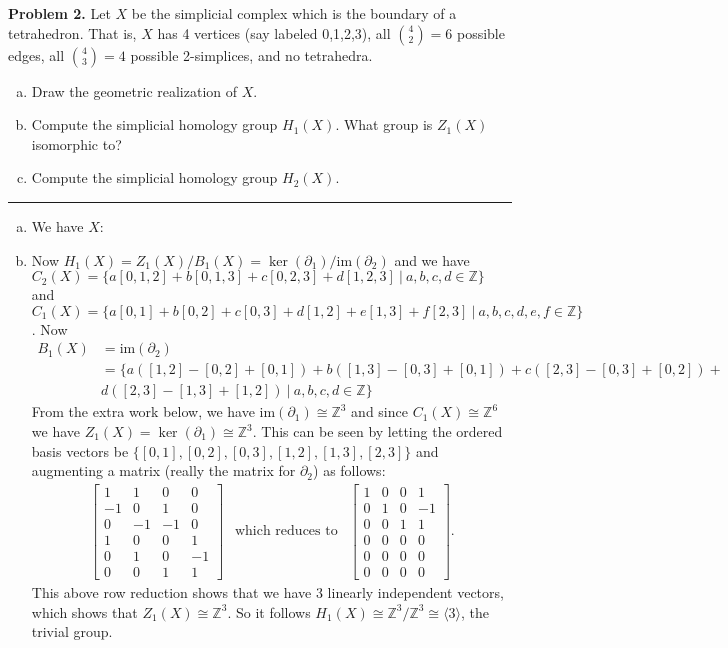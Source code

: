 \documentclass[leqno]{article}
\theoremstyle{nonumberplain}
\newcommand{\Z}{\ensuremath{\mathbb{Z}}}
\newcommand{\im}{\ensuremath{\mathrm{im}}}
\begin{document}
\noindent\textbf{Problem 2.} Let $X$ be the simplicial complex which is the boundary of a tetrahedron. That is, $X$ has 4 vertices (say labeled 0,1,2,3), all ${{4}\choose{2}}=6$ possible edges, all ${{4}\choose{3}} =4$ possible 2-simplices, and no tetrahedra.
\begin{enumerate}[(a)]
\item Draw the geometric realization of $X$.
\item Compute the simplicial homology group $H_1(X)$. What group is $Z_1(X)$ isomorphic to?
\item Compute the simplicial homology group $H_2(X)$. 
\end{enumerate}


\noindent\rule[0.5ex]{\linewidth}{1pt}
\begin{enumerate}[(a)]
\item We have $X$:
\vspace*{5cm}

\item Now $H_1(X)=Z_1(X)/B_1(X)=\ker(\partial_1)/\im(\partial_2)$ and we have $C_2(X)=\{a[0,1,2]+b[0,1,3]+c[0,2,3]+d[1,2,3]~\vert~ a,b,c,d\in \Z\}$ and $C_1(X)=\{a[0,1]+b[0,2]+c[0,3]+d[1,2]+e[1,3]+f[2,3]~\vert~a,b,c,d,e,f\in \Z\}$. Now 
\begin{align*}
B_1(X)&=\im(\partial_2)\\
&=\{a([1,2]-[0,2]+[0,1])+b([1,3]-[0,3]+[0,1])+c([2,3]-[0,3]+[0,2])+\\
&d([2,3]-[1,3]+[1,2])~\vert~ a,b,c,d \in \Z\}
\end{align*}
From the extra work below, we have $\im(\partial_1)\cong \Z^3$ and since $C_1(X)\cong \Z^6$ we have $Z_1(X)=\ker(\partial_1)\cong \Z^3$. This can be seen by letting the ordered basis vectors be $\{[0,1],[0,2],[0,3],[1,2],[1,3],[2,3]\}$ and augmenting a matrix (really the matrix for $\partial_2$) as follows:
\begin{align*}
\begin{bmatrix}
1 & 1 & 0 & 0\\
-1 & 0 & 1 & 0\\
0 & -1 & -1 & 0\\
1 & 0 & 0 & 1\\
0 & 1 & 0 & -1\\
0 & 0 & 1 & 1
\end{bmatrix} ~~\textrm{ which reduces to }~~ 
\begin{bmatrix}
1 & 0 & 0 & 1\\
0 & 1 & 0 & -1\\
0 & 0 & 1 & 1\\
0 & 0 & 0 & 0\\
0 & 0 & 0 & 0\\
0 & 0 & 0 & 0
\end{bmatrix}.
\end{align*}
This above row reduction shows that we have 3 linearly independent vectors, which shows that $Z_1(X)\cong \Z^3$. So it follows $H_1(X)\cong \Z^3/\Z^3\cong \langle 3 \rangle$, the trivial group. 


\end{enumerate}
\end{document}

